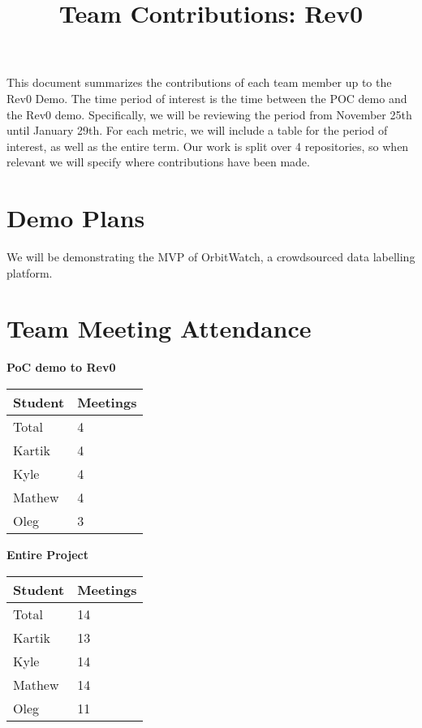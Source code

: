 \documentclass{article}
\title{Team Contributions: Rev0\\\progname}
\author{\authname}
\date{}
\begin{document}
\maketitle

This document summarizes the contributions of each team member up to the Rev0
Demo. The time period of interest is the time between the POC demo
and the Rev0 demo. Specifically, we will be reviewing the period from November 25th until January 29th. For each metric, we will include a table for the period of interest, as well as the entire term. Our work is split over 4 repositories, so when relevant we will specify
where contributions have been made.

\section{Demo Plans}



We will be demonstrating the MVP of OrbitWatch, a crowdsourced data labelling platform.


\section{Team Meeting Attendance}



\begin{table}[H]
\centering
\textbf{PoC demo to Rev0}\\
\begin{tabular}{ll}
\toprule
\textbf{Student} & \textbf{Meetings}\\
\midrule
Total & 4\\
Kartik & 4\\
Kyle & 4\\
Mathew & 4\\
Oleg & 3\\
\bottomrule
\end{tabular}
\end{table}


\begin{table}[H]
\centering
\textbf{Entire Project}\\
\begin{tabular}{ll}
\toprule
\textbf{Student} & \textbf{Meetings}\\
\midrule
Total & 14\\
Kartik & 13\\
Kyle & 14\\
Mathew & 14\\
Oleg & 11\\
\bottomrule
\end{tabular}
\end{table}
\end{document}
